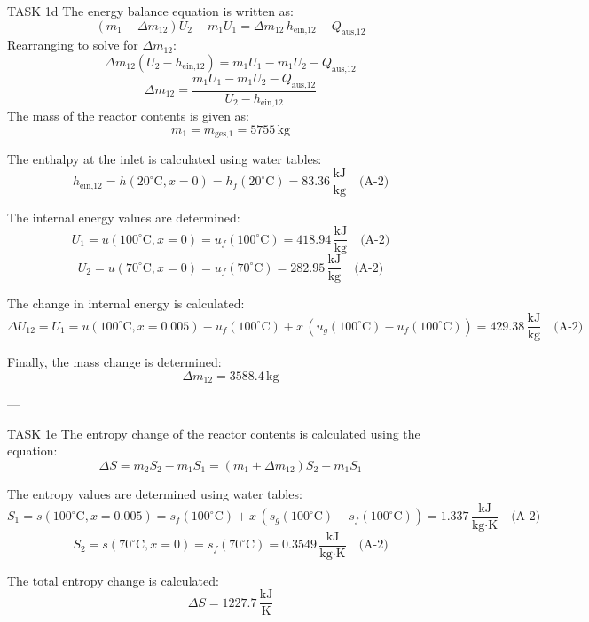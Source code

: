TASK 1d  
The energy balance equation is written as:  
\[
(m_1 + \Delta m_{12}) U_2 - m_1 U_1 = \Delta m_{12} \, h_{\text{ein,12}} - Q_{\text{aus,12}}
\]  
Rearranging to solve for \( \Delta m_{12} \):  
\[
\Delta m_{12} (U_2 - h_{\text{ein,12}}) = m_1 U_1 - m_1 U_2 - Q_{\text{aus,12}}
\]  
\[
\Delta m_{12} = \frac{m_1 U_1 - m_1 U_2 - Q_{\text{aus,12}}}{U_2 - h_{\text{ein,12}}}
\]  
The mass of the reactor contents is given as:  
\[
m_1 = m_{\text{ges,1}} = 5755 \, \text{kg}
\]  

The enthalpy at the inlet is calculated using water tables:  
\[
h_{\text{ein,12}} = h(20^\circ\text{C}, x=0) = h_f(20^\circ\text{C}) = 83.36 \, \frac{\text{kJ}}{\text{kg}} \quad \text{(A-2)}
\]  

The internal energy values are determined:  
\[
U_1 = u(100^\circ\text{C}, x=0) = u_f(100^\circ\text{C}) = 418.94 \, \frac{\text{kJ}}{\text{kg}} \quad \text{(A-2)}
\]  
\[
U_2 = u(70^\circ\text{C}, x=0) = u_f(70^\circ\text{C}) = 282.95 \, \frac{\text{kJ}}{\text{kg}} \quad \text{(A-2)}
\]  

The change in internal energy is calculated:  
\[
\Delta U_{12} = U_1 = u(100^\circ\text{C}, x=0.005) - u_f(100^\circ\text{C}) + x \, (u_g(100^\circ\text{C}) - u_f(100^\circ\text{C})) = 429.38 \, \frac{\text{kJ}}{\text{kg}} \quad \text{(A-2)}
\]  

Finally, the mass change is determined:  
\[
\Delta m_{12} = 3588.4 \, \text{kg}
\]  

---

TASK 1e  
The entropy change of the reactor contents is calculated using the equation:  
\[
\Delta S = m_2 S_2 - m_1 S_1 = (m_1 + \Delta m_{12}) S_2 - m_1 S_1
\]  

The entropy values are determined using water tables:  
\[
S_1 = s(100^\circ\text{C}, x=0.005) = s_f(100^\circ\text{C}) + x \, (s_g(100^\circ\text{C}) - s_f(100^\circ\text{C})) = 1.337 \, \frac{\text{kJ}}{\text{kg·K}} \quad \text{(A-2)}
\]  
\[
S_2 = s(70^\circ\text{C}, x=0) = s_f(70^\circ\text{C}) = 0.3549 \, \frac{\text{kJ}}{\text{kg·K}} \quad \text{(A-2)}
\]  

The total entropy change is calculated:  
\[
\Delta S = 1227.7 \, \frac{\text{kJ}}{\text{K}}
\]  